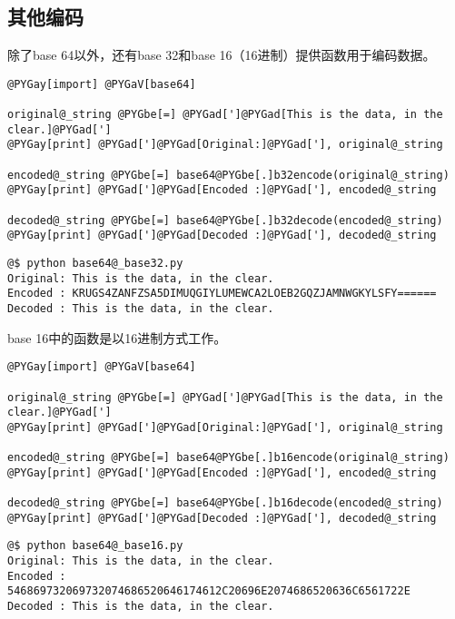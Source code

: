 \documentclass[a4paper,10pt,english]{manual}
\begin{document}
\subsection{其他编码}

除了base 64以外，还有base 32和base 16（16进制）提供函数用于编码数据。

\begin{Verbatim}[commandchars=@\[\]]
@PYGay[import] @PYGaV[base64]

original@_string @PYGbe[=] @PYGad[']@PYGad[This is the data, in the clear.]@PYGad[']
@PYGay[print] @PYGad[']@PYGad[Original:]@PYGad['], original@_string

encoded@_string @PYGbe[=] base64@PYGbe[.]b32encode(original@_string)
@PYGay[print] @PYGad[']@PYGad[Encoded :]@PYGad['], encoded@_string

decoded@_string @PYGbe[=] base64@PYGbe[.]b32decode(encoded@_string)
@PYGay[print] @PYGad[']@PYGad[Decoded :]@PYGad['], decoded@_string
\end{Verbatim}

\begin{Verbatim}[commandchars=@\[\]]
@$ python base64@_base32.py
Original: This is the data, in the clear.
Encoded : KRUGS4ZANFZSA5DIMUQGIYLUMEWCA2LOEB2GQZJAMNWGKYLSFY======
Decoded : This is the data, in the clear.
\end{Verbatim}

base 16中的函数是以16进制方式工作。

\begin{Verbatim}[commandchars=@\[\]]
@PYGay[import] @PYGaV[base64]

original@_string @PYGbe[=] @PYGad[']@PYGad[This is the data, in the clear.]@PYGad[']
@PYGay[print] @PYGad[']@PYGad[Original:]@PYGad['], original@_string

encoded@_string @PYGbe[=] base64@PYGbe[.]b16encode(original@_string)
@PYGay[print] @PYGad[']@PYGad[Encoded :]@PYGad['], encoded@_string

decoded@_string @PYGbe[=] base64@PYGbe[.]b16decode(encoded@_string)
@PYGay[print] @PYGad[']@PYGad[Decoded :]@PYGad['], decoded@_string
\end{Verbatim}

\begin{Verbatim}[commandchars=@\[\]]
@$ python base64@_base16.py
Original: This is the data, in the clear.
Encoded : 546869732069732074686520646174612C20696E2074686520636C6561722E
Decoded : This is the data, in the clear.
\end{Verbatim}
\end{document}
